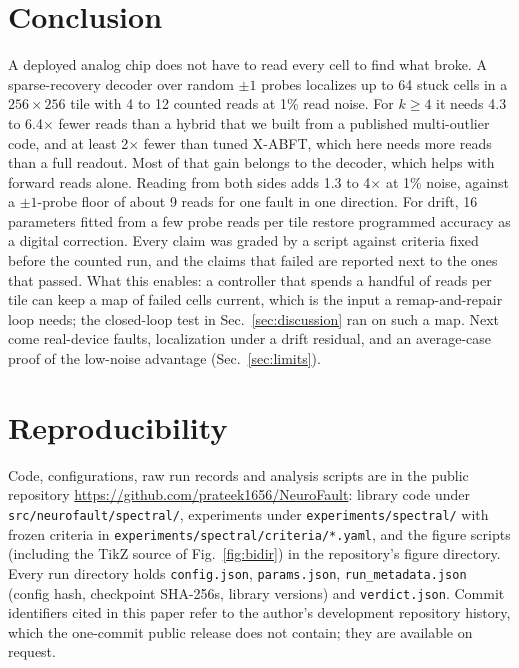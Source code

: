 \documentclass[journal]{IEEEtran}
\begin{document}
\section{Conclusion}
\label{sec:conclusion}
A deployed analog chip does not have to read every cell to find what broke. A sparse-recovery decoder over random $\pm1$ probes localizes up to 64 stuck cells in a $256\times256$ tile with 4 to 12 counted reads at 1\% read noise. For $k\ge4$ it needs 4.3 to 6.4$\times$ fewer reads than a hybrid that we built from a published multi-outlier code, and at least 2$\times$ fewer than tuned X-ABFT, which here needs more reads than a full readout. Most of that gain belongs to the decoder, which helps with forward reads alone. Reading from both sides adds 1.3 to 4$\times$ at 1\% noise, against a $\pm1$-probe floor of about 9 reads for one fault in one direction. For drift, 16 parameters fitted from a few probe reads per tile restore programmed accuracy as a digital correction. Every claim was graded by a script against criteria fixed before the counted run, and the claims that failed are reported next to the ones that passed.
What this enables: a controller that spends a handful of reads per tile can keep a map of failed cells current, which is the input a remap-and-repair loop needs; the closed-loop test in Sec.~\ref{sec:discussion} ran on such a map. Next come real-device faults, localization under a drift residual, and an average-case proof of the low-noise advantage (Sec.~\ref{sec:limits}).

\section*{Reproducibility}
Code, configurations, raw run records and analysis scripts are in the public repository \url{https://github.com/prateek1656/NeuroFault}: library code under \texttt{src/neurofault/spectral/}, experiments under \texttt{experiments/spectral/} with frozen criteria in \texttt{experiments/spectral/criteria/*.yaml}, and the figure scripts (including the TikZ source of Fig.~\ref{fig:bidir}) in the repository's figure directory. Every run directory holds \texttt{config.json}, \texttt{params.json}, \texttt{run\_metadata.json} (config hash, checkpoint SHA-256s, library versions) and \texttt{verdict.json}. Commit identifiers cited in this paper refer to the author's development repository history, which the one-commit public release does not contain; they are available on request.
\end{document}
